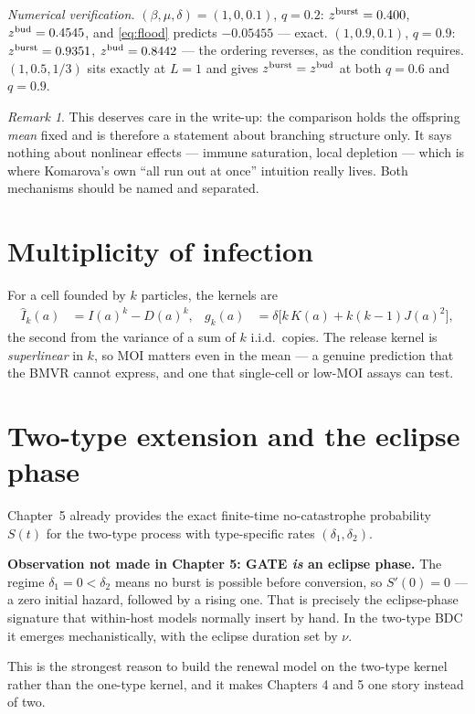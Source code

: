 \documentclass[11pt]{article}
\newcommand{\Ihat}{\widehat{I}}
\theoremstyle{plain}
\theoremstyle{definition}
\theoremstyle{remark}
\newtheorem{remark}[theorem]{Remark}
\begin{document}
\emph{Numerical verification.} $(\beta,\mu,\delta)=(1,0,0.1)$, $q=0.2$:
$z^{\rm burst}=0.400$, $z^{\rm bud}=0.4545$, and \eqref{eq:flood} predicts
$-0.05455$ --- exact. $(1,0.9,0.1)$, $q=0.9$: $z^{\rm burst}=0.9351$,
$z^{\rm bud}=0.8442$ --- the ordering reverses, as the condition requires.
$(1,0.5,1/3)$ sits exactly at $L=1$ and gives $z^{\rm burst}=z^{\rm bud}$ at both
$q=0.6$ and $q=0.9$.

\begin{remark}
This deserves care in the write-up: the comparison holds the offspring \emph{mean} fixed
and is therefore a statement about branching structure only. It says nothing about
nonlinear effects --- immune saturation, local depletion --- which is where Komarova's
own ``all run out at once'' intuition really lives. Both mechanisms should be named and
separated.
\end{remark}

\section{Multiplicity of infection}

For a cell founded by $k$ particles, the kernels are
\begin{align}
\Ihat_k(a)&=I(a)^k-D(a)^k, &
g_k(a)&=\delta\bigl[k\,K(a)+k(k-1)J(a)^2\bigr],
\end{align}
the second from the variance of a sum of $k$ i.i.d.\ copies. The release kernel is
\emph{superlinear} in $k$, so MOI matters even in the mean --- a genuine prediction that
the BMVR cannot express, and one that single-cell or low-MOI assays can test.

\section{Two-type extension and the eclipse phase}

Chapter~5 already provides the exact finite-time no-catastrophe probability $S(t)$ for
the two-type process with type-specific rates $(\delta_1,\delta_2)$.

\begin{framed}
\textbf{Observation not made in Chapter 5: GATE \emph{is} an eclipse phase.}
The regime $\delta_1=0<\delta_2$ means no burst is possible before conversion, so
$S'(0)=0$ --- a zero initial hazard, followed by a rising one. That is precisely the
eclipse-phase signature that within-host models normally insert by hand. In the two-type
BDC it emerges mechanistically, with the eclipse duration set by $\nu$.

This is the strongest reason to build the renewal model on the two-type kernel rather
than the one-type kernel, and it makes Chapters 4 and 5 one story instead of two.
\end{framed}
\end{document}
